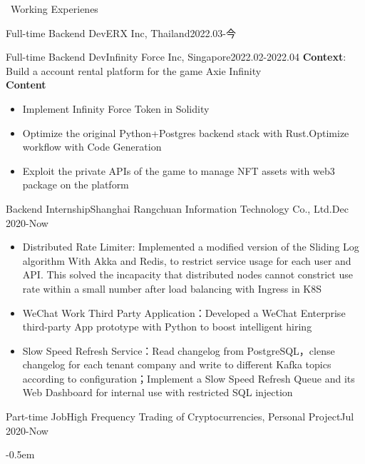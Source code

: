 \documentclass{resume}
\begin{document}
\begin{rSection}{\faUsers~Working Experienes}
\begin{rExperience}{Full-time Backend Dev}{ERX Inc, Thailand}{2022.03-今}
    \end{rExperience}
    \begin{rExperience}{Full-time Backend Dev}{Infinity Force Inc, Singapore}{2022.02-2022.04}
        \textbf{Context}:
        Build a account rental platform for the game Axie Infinity\\
        \textbf{Content}
        \begin{itemize}
            \itemsep -0.5em \vspace{-0.5em}
            \item Implement Infinity Force Token in Solidity
            \item Optimize the original Python+Postgres backend stack with Rust.Optimize workflow with Code Generation
            \item Exploit the private APIs of the game to manage NFT assets with web3 package on the platform
        \end{itemize}
    \end{rExperience}
    \begin{rExperience}{Backend Internship}{Shanghai Rangchuan Information Technology Co., Ltd.}{Dec 2020-Now}
        \begin{itemize}
            \itemsep -0.5em \vspace{-0.5em}
            \item Distributed Rate Limiter: Implemented  a modified version of the Sliding Log algorithm With Akka and Redis, to restrict service usage for each user and API. This solved the incapacity that distributed nodes cannot constrict use rate within a small number after load balancing with Ingress in K8S
            \item WeChat Work Third Party Application：Developed a WeChat Enterprise third-party App prototype with Python to boost intelligent hiring
            \item Slow Speed Refresh Service：Read changelog from PostgreSQL，clense changelog for each tenant company and write to different Kafka topics according to configuration；Implement a Slow Speed Refresh Queue and its Web Dashboard for internal use with restricted SQL injection       
        \end{itemize}
    \end{rExperience}
    \begin{rExperience}{Part-time Job}{High Frequency Trading of Cryptocurrencies, Personal Project}{Jul 2020-Now}
        \begin{itemize}
            \itemsep -0.5em \vspace{-0.5em}

\end{itemize}
\end{rExperience}
\end{rSection}
\end{document}
